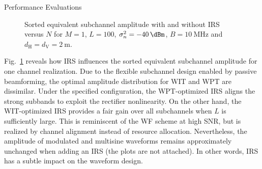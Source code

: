 \documentclass[journal]{IEEEtran}
\begin{document}
\begin{section}{Performance Evaluations}
		\begin{figure}[!t]
			\centering
			\caption{Sorted equivalent subchannel amplitude with and without IRS versus $N$ for $M=1$, $L=100$, $\sigma_n^2=\SI{-40}{\dBm}$, $B=\SI{10}{\MHz}$ and $d_{\mathrm{H}}=d_{\mathrm{V}}=\SI{2}{\meter}$.}
			\label{fi:channel_amplitude}
		\end{figure}

		Fig.~\ref{fi:channel_amplitude} reveals how IRS influences the sorted equivalent subchannel amplitude for one channel realization. Due to the flexible subchannel design enabled by passive beamforming, the optimal amplitude distribution for WIT and WPT are dissimilar. Under the specified configuration, the WPT-optimized IRS aligns the strong subbands to exploit the rectifier nonlinearity. On the other hand, the WIT-optimized IRS provides a fair gain over all subchannels when $L$ is sufficiently large. This is reminiscent of the WF scheme at high SNR, but is realized by channel alignment instead of resource allocation. Nevertheless, the amplitude of modulated and multisine waveforms remains approximately unchanged when adding an IRS (the plots are not attached). In other words, IRS has a subtle impact on the waveform design.


\end{section}
\end{document}
